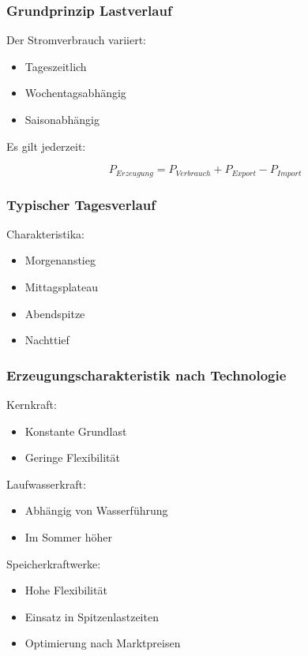 \subsubsection{Grundprinzip Lastverlauf}

Der Stromverbrauch variiert:

\begin{itemize}
\item Tageszeitlich
\item Wochentagsabhängig
\item Saisonabhängig
\end{itemize}

Es gilt jederzeit:

\[
P_{Erzeugung} = P_{Verbrauch} + P_{Export} - P_{Import}
\]

\subsubsection{Typischer Tagesverlauf}

Charakteristika:

\begin{itemize}
\item Morgenanstieg
\item Mittagsplateau
\item Abendspitze
\item Nachttief
\end{itemize}

\subsubsection{Erzeugungscharakteristik nach Technologie}

Kernkraft:

\begin{itemize}
\item Konstante Grundlast
\item Geringe Flexibilität
\end{itemize}

Laufwasserkraft:

\begin{itemize}
\item Abhängig von Wasserführung
\item Im Sommer höher
\end{itemize}

Speicherkraftwerke:

\begin{itemize}
\item Hohe Flexibilität
\item Einsatz in Spitzenlastzeiten
\item Optimierung nach Marktpreisen
\end{itemize}


